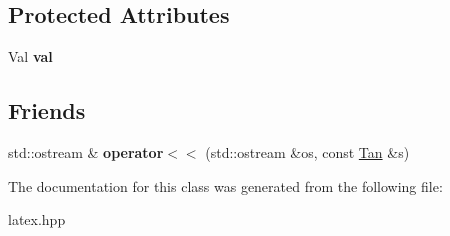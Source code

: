 \subsection*{Protected Attributes}
\begin{DoxyCompactItemize}
\item 
\hypertarget{classlatex_1_1math_1_1Tan_aee83237cb396c81b33cc796dbc656c2c}{Val {\bfseries val}}\label{classlatex_1_1math_1_1Tan_aee83237cb396c81b33cc796dbc656c2c}

\end{DoxyCompactItemize}
\subsection*{Friends}
\begin{DoxyCompactItemize}
\item 
\hypertarget{classlatex_1_1math_1_1Tan_aff2a3cbbce2f6ab1f880cd308d1e092d}{std\-::ostream \& {\bfseries operator$<$$<$} (std\-::ostream \&os, const \hyperlink{classlatex_1_1math_1_1Tan}{Tan} \&s)}\label{classlatex_1_1math_1_1Tan_aff2a3cbbce2f6ab1f880cd308d1e092d}

\end{DoxyCompactItemize}


The documentation for this class was generated from the following file\-:\begin{DoxyCompactItemize}
\item 
latex.\-hpp\end{DoxyCompactItemize}
